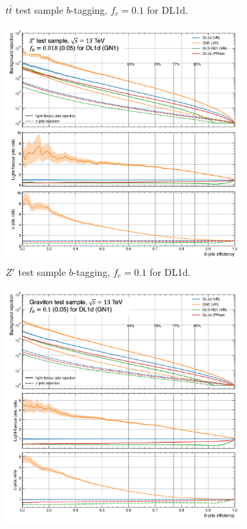 \begin{figure}
\begin{subfigure}[t]{0.32\textwidth}
    \caption{$t\bar{t}$ test sample $b$-tagging, $f_c = 0.1$ for DL1d.}
    \label{fig:dl1dVRROCttc}
  \end{subfigure}
  \hfill
  \begin{subfigure}[t]{0.32\textwidth}
    \centering
    \includegraphics[width=\textwidth]{Images/FTAG/VRDL1d/ROC/zpbupf.png}
    \caption{$Z'$ test sample $b$-tagging, $f_c = 0.1$ for DL1d.}
    \label{fig:dl1dVRROCzpc}
  \end{subfigure}
  \hfill
  \begin{subfigure}[t]{0.32\textwidth}
    \centering
    \includegraphics[width=\textwidth]{Images/FTAG/VRDL1d/ROC/grbupf.png}

\end{subfigure}
\end{figure}
